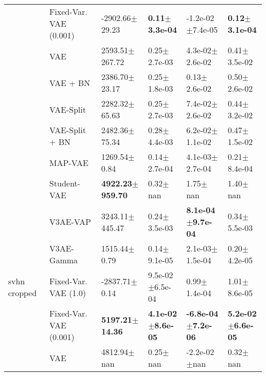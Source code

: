 \begin{tabular}{llllll}
             & Fixed-Var. VAE (0.001) &           -2902.66$\pm$29.23 &     \textbf{0.11$\pm$3.3e-04} &           -1.2e-02$\pm$7.4e-05 &     \textbf{0.12$\pm$3.1e-04} \\
             & VAE &           2593.51$\pm$267.72 &              0.25$\pm$2.7e-03 &            4.3e-02$\pm$2.6e-02 &              0.41$\pm$3.5e-02 \\
             & VAE + BN &            2386.70$\pm$23.17 &              0.25$\pm$1.8e-03 &               0.13$\pm$2.6e-02 &              0.50$\pm$2.6e-02 \\
             & VAE-Split &            2282.32$\pm$65.63 &              0.25$\pm$2.7e-03 &            7.4e-02$\pm$2.6e-02 &              0.44$\pm$3.2e-02 \\
             & VAE-Split + BN &            2482.36$\pm$75.34 &              0.28$\pm$4.4e-03 &            6.2e-02$\pm$1.1e-02 &              0.47$\pm$1.5e-02 \\
             & MAP-VAE &             1269.54$\pm$0.84 &              0.14$\pm$2.7e-04 &            4.1e-03$\pm$2.7e-04 &              0.21$\pm$8.4e-04 \\
             & Student-VAE &  \textbf{4922.23$\pm$959.70} &                  0.32$\pm$nan &                   1.75$\pm$nan &                  1.40$\pm$nan \\
             & V3AE-VAP &           3243.11$\pm$445.47 &              0.24$\pm$3.5e-03 &   \textbf{8.1e-04$\pm$9.7e-04} &              0.34$\pm$5.5e-03 \\
             & V3AE-Gamma &             1515.44$\pm$0.79 &              0.14$\pm$9.1e-05 &            2.1e-03$\pm$1.5e-04 &              0.20$\pm$4.2e-05 \\
svhn cropped & Fixed-Var. VAE (1.0) &            -2837.71$\pm$0.14 &           9.5e-02$\pm$6.5e-04 &               0.99$\pm$1.4e-04 &              1.01$\pm$8.6e-05 \\
             & Fixed-Var. VAE (0.001) &   \textbf{5197.21$\pm$14.36} &  \textbf{4.1e-02$\pm$8.6e-05} &  \textbf{-6.8e-04$\pm$7.2e-06} &  \textbf{5.2e-02$\pm$6.6e-05} \\
             & VAE &              4812.94$\pm$nan &                  0.25$\pm$nan &               -2.2e-02$\pm$nan &                  0.32$\pm$nan \\
\bottomrule
\end{tabular}

